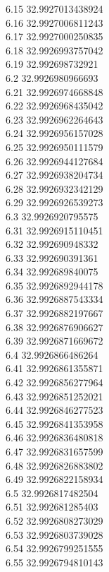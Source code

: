 {6.15	32.9927013438924\\
6.16	32.9927006811243\\
6.17	32.9927000250835\\
6.18	32.9926993757042\\
6.19	32.992698732921\\
6.2	32.9926980966693\\
6.21	32.9926974668848\\
6.22	32.9926968435042\\
6.23	32.9926962264643\\
6.24	32.9926956157028\\
6.25	32.9926950111579\\
6.26	32.9926944127684\\
6.27	32.9926938204734\\
6.28	32.9926932342129\\
6.29	32.9926926539273\\
6.3	32.9926920795575\\
6.31	32.9926915110451\\
6.32	32.992690948332\\
6.33	32.992690391361\\
6.34	32.992689840075\\
6.35	32.9926892944178\\
6.36	32.9926887543334\\
6.37	32.9926882197667\\
6.38	32.9926876906627\\
6.39	32.9926871669672\\
6.4	32.9926866486264\\
6.41	32.9926861355871\\
6.42	32.9926856277964\\
6.43	32.9926851252021\\
6.44	32.9926846277523\\
6.45	32.9926841353958\\
6.46	32.9926836480818\\
6.47	32.9926831657599\\
6.48	32.9926826883802\\
6.49	32.9926822158934\\
6.5	32.9926817482504\\
6.51	32.992681285403\\
6.52	32.9926808273029\\
6.53	32.9926803739028\\
6.54	32.9926799251555\\
6.55	32.9926794810143\\
}
